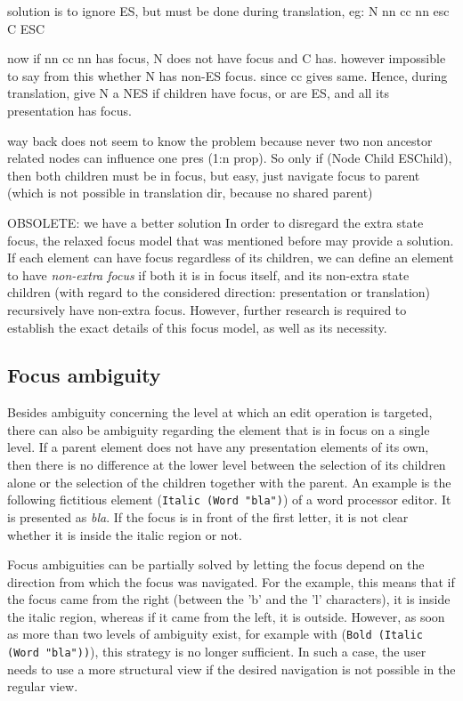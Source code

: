 \bc
solution is to ignore ES, but must be done during translation, eg:
  N       nn cc nn esc
C ESC 

now if nn cc nn has focus, N does not have focus and C has. however impossible to say from this whether N has non-ES focus. since cc gives same. Hence, during translation, give N a NES if children have focus, or are ES, and all its presentation has focus.
\ec

\bc
way back does not seem to know the problem because never two non ancestor related nodes can influence one pres (1:n prop). So only if (Node Child ESChild), then both children must be in focus, but easy, just navigate focus to parent (which is not possible in translation dir, because no shared parent)
\ec

\bc OBSOLETE: we have a better solution
In order to disregard the extra state focus, the relaxed focus model that was mentioned before may provide a solution. If each element can have focus regardless of its children, we can define an element to have {\em non-extra focus} if both it is in focus itself, and its non-extra state children (with regard to the considered direction: presentation or translation) recursively have non-extra focus. However, further research is required to establish the exact details of this focus model, as well as its necessity.
\ec

%																
\subsection{Focus ambiguity}

Besides ambiguity concerning the level at which an edit operation is targeted, there can also be  ambiguity regarding the element that is in focus on a single level. If a parent element does not have any presentation elements of its own, then there is no difference at the lower level between the selection of its children alone or the selection of the children together with the parent. An example is the following fictitious element (\verb|Italic (Word "bla")|) of a word processor editor. It is presented as {\it bla}. If the focus is in front of the first letter, it is not clear whether it is inside the italic region or not. 

Focus ambiguities can be partially solved by letting the focus depend on the direction from which the focus was navigated. For the example, this means that if the focus came from the right (between the 'b' and the 'l' characters), it is inside the italic region, whereas if it came from the left, it is outside. However, as soon as more than two levels of ambiguity exist, for example with (\verb|Bold (Italic (Word "bla"))|), this strategy is no longer sufficient. In such a case, the user needs to use a more structural view if the desired navigation is not possible in the regular view.


